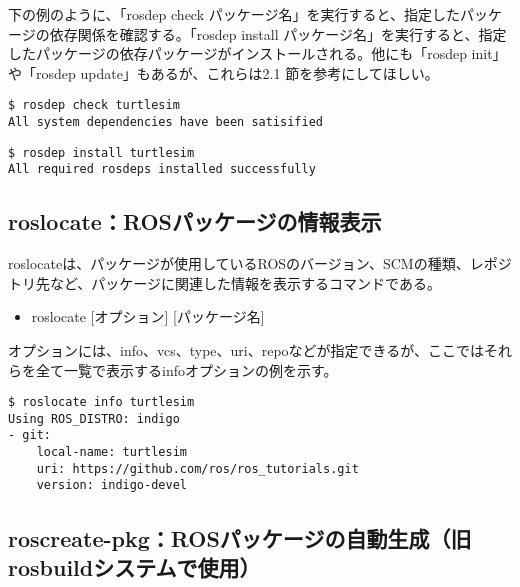下の例のように、「rosdep check パッケージ名」を実行すると、指定したパッケージの依存関係を確認する。「rosdep install パッケージ名」を実行すると、指定したパッケージの依存パッケージがインストールされる。他にも「rosdep init」や「rosdep update」もあるが、これらは2.1 節を参考にしてほしい。

\begin{lstlisting}[language=ROS]
$ rosdep check turtlesim
All system dependencies have been satisified
\end{lstlisting}

\begin{lstlisting}[language=ROS]
$ rosdep install turtlesim
All required rosdeps installed successfully
\end{lstlisting}

\subsection{roslocate：ROSパッケージの情報表示}

roslocateは、パッケージが使用しているROSのバージョン、SCMの種類、レポジトリ先など、パッケージに関連した情報を表示するコマンドである。

\vspace{\baselineskip}
\begin{itemize}
\item roslocate [オプション] [パッケージ名]
\end{itemize}
\vspace{\baselineskip}

オプションには、info、vcs、type、uri、repoなどが指定できるが、ここではそれらを全て一覧で表示するinfoオプションの例を示す。\\

\begin{lstlisting}[language=ROS]
$ roslocate info turtlesim
Using ROS_DISTRO: indigo
- git:
    local-name: turtlesim
    uri: https://github.com/ros/ros_tutorials.git
    version: indigo-devel
\end{lstlisting}

\subsection{roscreate-pkg：ROSパッケージの自動生成（旧rosbuildシステムで使用）}

